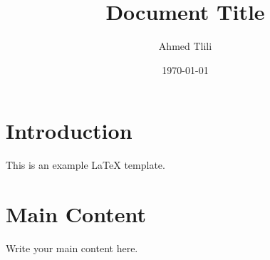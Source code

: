 \documentclass[a4paper,11pt]{article}
\title{Document Title}
\author{Ahmed Tlili}
\date{\today}
\begin{document}
\maketitle

\section{Introduction}
This is an example LaTeX template.

\section{Main Content}
Write your main content here.
\end{document}
